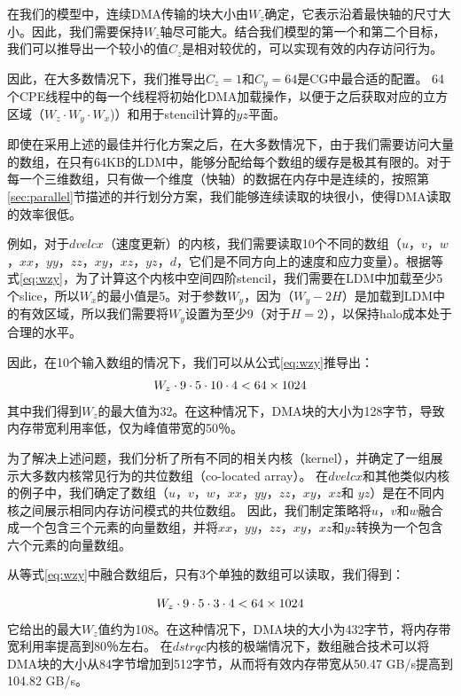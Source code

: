 \documentclass[degree=doctor]{thuthesis}
\begin{document}
在我们的模型中，连续DMA传输的块大小由$ W_z $确定，它表示沿着最快轴的尺寸大小。因此，我们需要保持$ W_z $轴尽可能大。结合我们模型的第一个和第二个目标，我们可以推导出一个较小的值$ C_z $是相对较优的，可以实现有效的内存访问行为。

因此，在大多数情况下，我们推导出$ C_z = 1 $和$ C_y = 64 $是CG中最合适的配置。 64个CPE线程中的每一个线程将初始化DMA加载操作，以便于之后获取对应的立方区域（$W_z \cdot W_y \cdot W_x$)）和用于stencil计算的$ yz $平面。

即使在采用上述的最佳并行化方案之后，在大多数情况下，由于我们需要访问大量的数组，在只有64KB的LDM中，能够分配给每个数组的缓存是极其有限的。对于每一个三维数组，只有做一个维度（快轴）的数据在内存中是连续的，按照第\ref{sec:parallel}节描述的并行划分方案，我们能够连续读取的块很小，使得DMA读取的效率很低。

例如，对于$ dvelcx $（速度更新）的内核，我们需要读取10个不同的数组（$ u $，$ v $，$ w $，$ xx $，$ yy $，$ zz $，$ xy $，$ xz $，$ yz $，$ d $，它们是不同方向上的速度和应力变量）。根据等式\ref {eq:wzy}，为了计算这个内核中空间四阶stencil，我们需要在LDM中加载至少5个slice，所以$ W_x $的最小值是5。对于参数$ W_y $，因为$（W_y-2H）$是加载到LDM中的有效区域，所以我们需要将$ W_y $设置为至少9（对于$ H = 2 $），以保持halo成本处于合理的水平。

因此，在10个输入数组的情况下，我们可以从公式\ref{eq:wzy}推导出：
\begin{equation}
W_z \cdot 9 \cdot 5 \cdot 10 \cdot 4 < 64 \times 1024\\
\label{eq:wzy1}
\end{equation}
其中我们得到$ W_z $的最大值为32。在这种情况下，DMA块的大小为128字节，导致内存带宽利用率低，仅为峰值带宽的50％。

为了解决上述问题，我们分析了所有不同的相关内核（kernel），并确定了一组展示大多数内核常见行为的共位数组（co-located array）。 在$ dvelcx $和其他类似内核的例子中，我们确定了数组（$ u $，$ v $，$ w $，$ xx $，$ yy $，$ zz $，$ xy $，$ xz $和 $ yz $）是在不同内核之间展示相同内存访问模式的共位数组。 因此，我们制定策略将$ u $，$ v $和$ w $融合成一个包含三个元素的向量数组，并将$ xx $，$ yy $，$ zz $，$ xy $，$ xz $和$ yz $转换为一个包含六个元素的向量数组。

从等式\ref{eq:wzy}中融合数组后，只有3个单独的数组可以读取，我们得到：

\begin{equation}
W_z \cdot 9 \cdot 5 \cdot 3 \cdot 4 < 64 \times 1024\\
\label{eq:wzy2}
\end{equation}
它给出的最大$ W_z $值约为108。在这种情况下，DMA块的大小为432字节，将内存带宽利用率提高到80％左右。 在$ dstrqc $内核的极端情况下，数组融合技术可以将DMA块的大小从84字节增加到512字节，从而将有效内存带宽从50.47 GB/s提高到104.82 GB/s。
\end{document}
